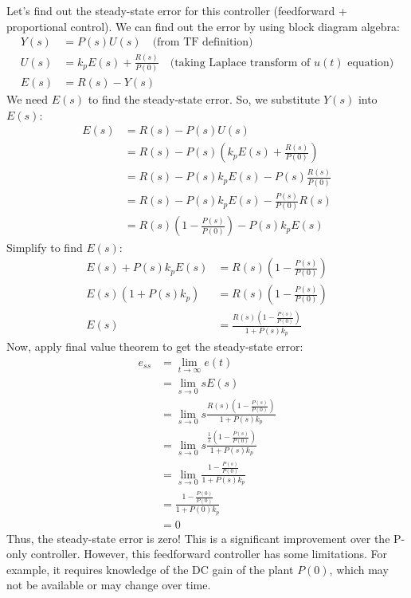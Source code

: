 \documentclass{ee122_notes}
\begin{document}
Let's find out the steady-state error for this controller (feedforward + proportional control). We can find out the error by using block diagram algebra:
\begin{align*}
    Y(s) &= P(s) U(s) \quad \text{(from TF definition)}\\
    U(s) &= k_p E(s) + \frac{R(s)}{P(0)} \quad \text{(taking Laplace transform of $u(t)$ equation)} \\
    E(s) &= R(s) - Y(s)
\end{align*}
We need $E(s)$ to find the steady-state error. So, we substitute $Y(s)$ into $E(s)$:
\begin{align*}
    E(s) &= R(s) - P(s) U(s) \\
    &= R(s) - P(s) \left(k_p E(s) + \frac{R(s)}{P(0)}\right) \\
    &= R(s) - P(s) k_p E(s) - P(s) \frac{R(s)}{P(0)} \\
    &= R(s) - P(s) k_p E(s) - \frac{P(s)}{P(0)} R(s) \\
    &= R(s) \left(1 - \frac{P(s)}{P(0)}\right) - P(s) k_p E(s)
\end{align*}
Simplify to find $E(s)$:
\begin{align*}
    E(s) + P(s) k_p E(s) &= R(s) \left(1 - \frac{P(s)}{P(0)}\right) \\
    E(s)(1 + P(s) k_p) &= R(s) \left(1 - \frac{P(s)}{P(0)}\right) \\
    E(s) &= \frac{R(s) \left(1 - \frac{P(s)}{P(0)}\right)}{1 + P(s) k_p}
\end{align*}
Now, apply final value theorem to get the steady-state error:
\begin{align*}
    e_{ss} &= \lim_{t \to \infty} e(t) \\
    &= \lim_{s \to 0} s E(s) \\
    &= \lim_{s \to 0} s \frac{R(s) \left(1 - \frac{P(s)}{P(0)}\right)}{1 + P(s) k_p} \\
    &= \lim_{s \to 0} s \frac{\frac{1}{s} \left(1 - \frac{P(s)}{P(0)}\right)}{1 + P(s) k_p} \\
    &= \lim_{s \to 0} \frac{1 - \frac{P(s)}{P(0)}}{1 + P(s) k_p} \\
    &= \frac{1 - \frac{P(0)}{P(0)}}{1 + P(0) k_p} \\
    &= 0
\end{align*}
Thus, the steady-state error is zero! This is a significant improvement over the P-only controller. However, this feedforward controller has some limitations. For example, it requires knowledge of the DC gain of the plant $P(0)$, which may not be available or may change over time. 
\end{document}
